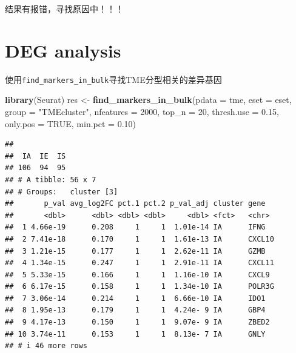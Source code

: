 \documentclass[
  12pt,
]{book}
\newenvironment{Shaded}{\begin{snugshade}}{\end{snugshade}}
\newcommand{\AttributeTok}[1]{\textcolor[rgb]{0.13,0.29,0.53}{#1}}
\newcommand{\ConstantTok}[1]{\textcolor[rgb]{0.56,0.35,0.01}{#1}}
\newcommand{\DecValTok}[1]{\textcolor[rgb]{0.00,0.00,0.81}{#1}}
\newcommand{\FloatTok}[1]{\textcolor[rgb]{0.00,0.00,0.81}{#1}}
\newcommand{\FunctionTok}[1]{\textcolor[rgb]{0.13,0.29,0.53}{\textbf{#1}}}
\newcommand{\NormalTok}[1]{#1}
\newcommand{\OtherTok}[1]{\textcolor[rgb]{0.56,0.35,0.01}{#1}}
\newcommand{\SpecialCharTok}[1]{\textcolor[rgb]{0.81,0.36,0.00}{\textbf{#1}}}
\newcommand{\StringTok}[1]{\textcolor[rgb]{0.31,0.60,0.02}{#1}}
\theoremstyle{definition}
\theoremstyle{definition}
\theoremstyle{definition}
\theoremstyle{definition}
\theoremstyle{remark}
\begin{document}
结果有报错，寻找原因中！！！

\hypertarget{deg-analysis-1}{%
\section{DEG analysis}\label{deg-analysis-1}}

使用\texttt{find\_markers\_in\_bulk}寻找TME分型相关的差异基因

\begin{Shaded}
\begin{Highlighting}[]
\FunctionTok{library}\NormalTok{(Seurat)}
\NormalTok{res }\OtherTok{\textless{}{-}} \FunctionTok{find\_markers\_in\_bulk}\NormalTok{(}\AttributeTok{pdata      =}\NormalTok{ tme, }
                            \AttributeTok{eset       =}\NormalTok{ eset, }
                            \AttributeTok{group      =} \StringTok{"TMEcluster"}\NormalTok{, }
                            \AttributeTok{nfeatures  =} \DecValTok{2000}\NormalTok{, }
                            \AttributeTok{top\_n      =} \DecValTok{20}\NormalTok{, }
                            \AttributeTok{thresh.use =} \FloatTok{0.15}\NormalTok{, }
                            \AttributeTok{only.pos   =} \ConstantTok{TRUE}\NormalTok{, }
                            \AttributeTok{min.pct    =} \FloatTok{0.10}\NormalTok{)}
\end{Highlighting}
\end{Shaded}

\begin{verbatim}
## 
##  IA  IE  IS 
## 106  94  95 
## # A tibble: 56 x 7
## # Groups:   cluster [3]
##       p_val avg_log2FC pct.1 pct.2 p_val_adj cluster gene  
##       <dbl>      <dbl> <dbl> <dbl>     <dbl> <fct>   <chr> 
##  1 4.66e-19      0.208     1     1  1.01e-14 IA      IFNG  
##  2 7.41e-18      0.170     1     1  1.61e-13 IA      CXCL10
##  3 1.21e-15      0.177     1     1  2.62e-11 IA      GZMB  
##  4 1.34e-15      0.247     1     1  2.91e-11 IA      CXCL11
##  5 5.33e-15      0.166     1     1  1.16e-10 IA      CXCL9 
##  6 6.17e-15      0.158     1     1  1.34e-10 IA      POLR3G
##  7 3.06e-14      0.214     1     1  6.66e-10 IA      IDO1  
##  8 1.95e-13      0.179     1     1  4.24e- 9 IA      GBP4  
##  9 4.17e-13      0.150     1     1  9.07e- 9 IA      ZBED2 
## 10 3.74e-11      0.153     1     1  8.13e- 7 IA      GNLY  
## # i 46 more rows
\end{verbatim}

\begin{Shaded}
\end{Shaded}
\end{document}

